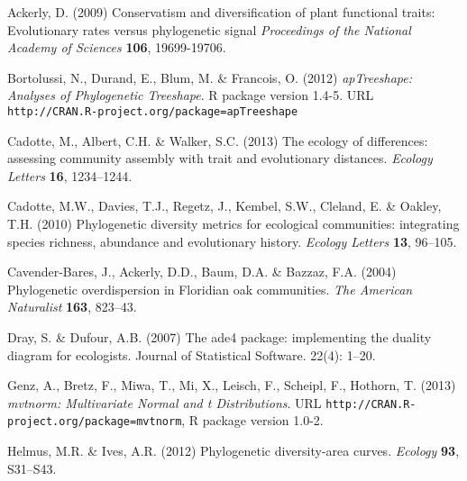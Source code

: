 \documentclass{bioinfo}
\begin{document}
\begin{thebibliography}{30}
\providecommand{\natexlab}[1]{#1}
\providecommand{\url}[1]{\texttt{#1}}
\providecommand{\urlprefix}{URL }

 Ackerly, D. (2009) Conservatism
  and diversification of plant functional traits: Evolutionary rates
  versus phylogenetic signal \emph{Proceedings of the National Academy
    of Sciences} \textbf{106}, 19699-19706.

 Bortolussi, N., Durand, E., Blum, M. \&
  Francois, O. (2012) \emph{apTreeshape: Analyses of Phylogenetic
    Treeshape}. R package version
  1.4-5. \urlprefix\url{http://CRAN.R-project.org/package=apTreeshape}

Cadotte, M., Albert, C.H. \& Walker, S.C. (2013) The ecology of differences:
  assessing community assembly with trait and evolutionary distances.
  \emph{Ecology Letters} \textbf{16}, 1234--1244.

Cadotte, M.W., Davies, T.J., Regetz, J., Kembel, S.W., Cleland, E. \& Oakley,
  T.H. (2010) Phylogenetic diversity metrics for ecological communities:
  integrating species richness, abundance and evolutionary history.
  \emph{Ecology Letters} \textbf{13}, 96--105.

  Cavender-Bares, J., Ackerly, D.D., Baum, D.A. \& Bazzaz, F.A. (2004)
  {Phylogenetic overdispersion in Floridian oak
    communities}. \emph{The American Naturalist} \textbf{163},
  823--43.

 Dray, S. \&
  Dufour, A.B. (2007) The ade4 package: implementing the duality
  diagram for ecologists. Journal of Statistical Software. 22(4):
  1--20.

 Genz, A., Bretz, F.,
  Miwa, T., Mi, X., Leisch, F., Scheipl, F., Hothorn, T. (2013)
  \emph{mvtnorm: Multivariate Normal and t
    Distributions}. \urlprefix\url{http://CRAN.R-project.org/package=mvtnorm},
  R package version 1.0-2.

Helmus, M.R. \& Ives, A.R. (2012) Phylogenetic diversity-area curves.
  \emph{Ecology} \textbf{93}, S31--S43.


\end{thebibliography}
\end{document}
